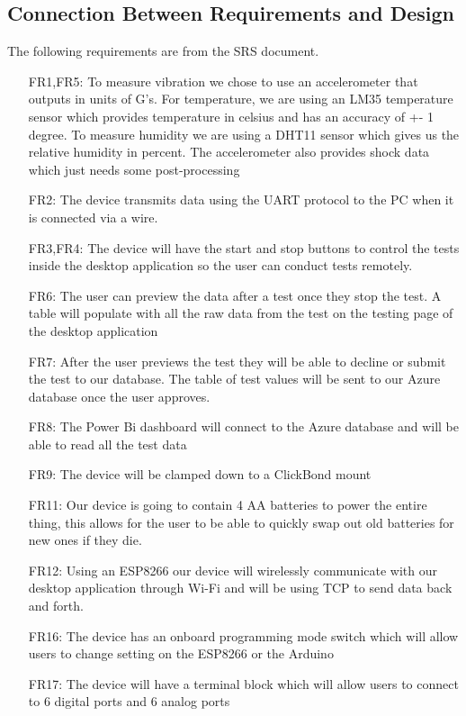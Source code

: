 \documentclass[12pt, titlepage]{article}
\begin{document}
\newpage
\subsection{Connection Between Requirements and Design} \label{SecConnection}
The following requirements are from the SRS document.

\begin{itemize}
  \item[FR1,FR5:] To measure vibration we chose to use an accelerometer that outputs in units of G's. For temperature, we are using an LM35 temperature sensor which provides temperature in celsius and has an accuracy of +- 1 degree. To measure humidity we are using a DHT11 sensor which gives us the relative humidity in percent. The accelerometer also provides shock data which just needs some post-processing
  \item[FR2:] The device transmits data using the UART protocol to the PC when it is connected via a wire.
  \item[FR3,FR4:] The device will have the start and stop buttons to control the tests inside the desktop application so the user can conduct tests remotely.
  \item[FR6:] The user can preview the data after a test once they stop the test. A table will populate with all the raw data from the test on the testing page of the desktop application
  \item[FR7:] After the user previews the test they will be able to decline or submit the test to our database. The table of test values will be sent to our Azure database once the user approves.
  \item[FR8:] The Power Bi dashboard will connect to the Azure database and will be able to read all the test data
  \item[FR9:] The device will be clamped down to a ClickBond mount
  \item[FR11:] Our device is going to contain 4 AA batteries to power the entire thing, this allows for the user to be able to quickly swap out old batteries for new ones if they die.
  \item[FR12:] Using an ESP8266 our device will wirelessly communicate with our desktop application through Wi-Fi and will be using TCP to send data back and forth.
  \item[FR16:]  The device has an onboard programming mode switch which will allow users to change setting on the ESP8266 or the Arduino
  \item[FR17:] The device will have a terminal block which will allow users to connect to 6 digital ports and 6 analog ports      
  
\end{itemize}
\end{document}
